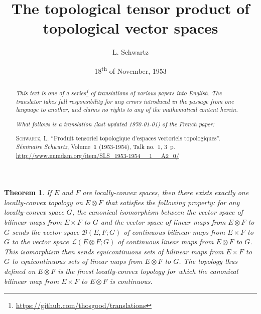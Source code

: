 \documentclass{article}
\title{The topological tensor product of topological vector spaces}
\author{L. Schwartz}
\date{18\textsuperscript{th} of November, 1953}
\theoremstyle{plain}
\newtheorem*{theorem}{Theorem}
\theoremstyle{definition}
\newcommand{\BB}{\mathcal{B}}
\newcommand{\LL}{\mathcal{L}}
\newcommand{\oldpage}[1]{\marginpar{\footnotesize$\Big\vert$ \textit{p.~#1}}}
\begin{document}
\maketitle
\thispagestyle{fancy}

\renewcommand{\abstractname}{Translator's note.}

\begin{abstract}
  \renewcommand*{\thefootnote}{\fnsymbol{footnote}}
  \emph{This text is one of a series\footnote{\url{https://github.com/thosgood/translations}} of translations of various papers into English.}
  \emph{The translator takes full responsibility for any errors introduced in the passage from one language to another, and claims no rights to any of the mathematical content herein.}
  
  \emph{What follows is a translation (last updated \today) of the French paper:}

  \medskip\noindent
  \textsc{Schwartz, L.}
  ``Produit tensoriel topologique d'espaces vectoriels topologiques''.
  \emph{S\'{e}minaire Schwartz}, Volume~\textbf{1} (1953-1954), Talk no.~1, 3~p.
  {\footnotesize\url{http://www.numdam.org/item/SLS_1953-1954__1__A2_0/}}
\end{abstract}

\setcounter{footnote}{0}



\oldpage{1}
\begin{theorem}
  If $E$ and $F$ are locally-convex spaces, then there exists exactly one locally-convex topology on $E\otimes F$ that satisfies the following property:
  for any locally-convex space $G$, the canonical isomorphism between the vector space of bilinear maps from $E\times F$ to $G$ and the vector space of linear maps from $E\otimes F$ to $G$ sends the vector space $\BB(E,F;G)$ of continuous bilinear maps from $E\times F$ to $G$ to the vector space $\LL(E\otimes F;G)$ of continuous linear maps from $E\otimes F$ to $G$.
  This isomorphism then sends equicontinuous sets of bilinear maps from $E\times F$ to $G$ to equicontinuous sets of linear maps from $E\otimes F$ to $G$.
  The topology thus defined on $E\otimes F$ is the finest locally-convex topology for which the canonical bilinear map from $E\times F$ to $E\otimes F$ is continuous.
\end{theorem}
\end{document}
